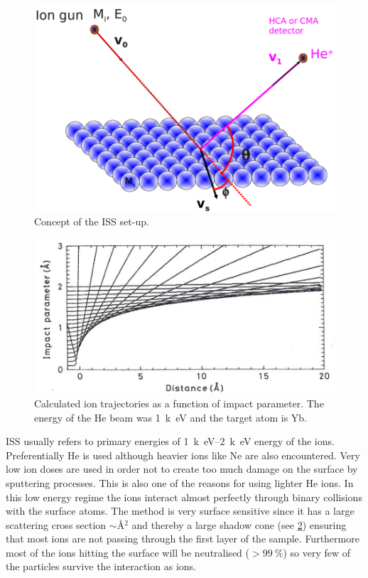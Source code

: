 \begin{figure}[h!]
	\begin{center}
	\includegraphics[scale=0.4]{figures/iss_ny_udg_11_01.png}
	\caption{Concept of the ISS set-up.}
	\label{fig:isssetup}
	\end{center}
\end{figure}

\begin{figure}[h!]
	\begin{center}
	\includegraphics[scale=4]{figures/11_02.png}
	\caption{Calculated  ion trajectories as a function of impact parameter. The energy of the He beam was \SI{1}{k\electronvolt} and the target atom is Yb.}
	\label{fig:hetraject}
	\end{center}
\end{figure}

ISS usually refers to primary energies of \SIrange{1}{2}{k\electronvolt} energy of the ions. Preferentially He is used although heavier ions like Ne are also encountered. Very low ion doses are used in order not to create too much damage on the surface by sputtering processes. This is also one of the reasons for using lighter He ions. In this low  energy regime the ions interact almost perfectly through binary collisions with the surface atoms. The method is very surface sensitive since it has a large scattering cross section $\sim \si{\angstrom^2}$ and thereby a large shadow cone (see \ref{fig:hetraject}) ensuring that most ions are not passing through the first layer of the sample. Furthermore most of the ions hitting the surface will be neutralised ($>\SI{99}{\percent}$) so very few of the particles survive the interaction as ions.

